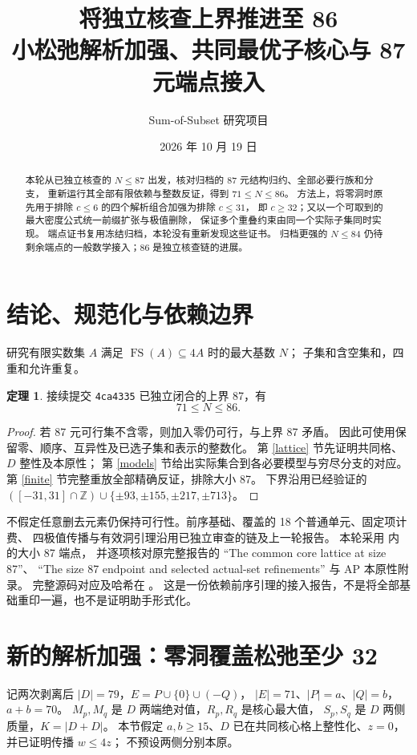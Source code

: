 \documentclass[11pt,a4paper]{article}
\title{将独立核查上界推进至 86\\\large 小松弛解析加强、共同最优子核心与 87 元端点接入}
\author{Sum-of-Subset 研究项目}
\date{2026 年 10 月 19 日}
\newcommand{\FS}{\operatorname{FS}}
\newcommand{\Z}{\mathbb Z}
\theoremstyle{definition}
\newtheorem{theorem}{定理}[section]
\begin{document}
\maketitle
\begin{abstract}
本轮从已独立核查的 $N\le87$ 出发，核对归档的 87 元结构归约、全部必要行族和分支，
重新运行其全部有限依赖与整数反证，得到 $71\le N\le86$。
方法上，将零洞时原先用于排除 $c\le6$ 的四个解析组合加强为排除 $c\le31$，
即 $c\ge32$；又以一个可取到的最大密度公式统一前缀扩张与极值删除，
保证多个重叠约束由同一个实际子集同时实现。
端点证书复用冻结归档，本轮没有重新发现这些证书。
归档更强的 $N\le84$ 仍待剩余端点的一般数学接入；86 是独立核查链的进展。
\end{abstract}

\section{结论、规范化与依赖边界}
研究有限实数集 $A$ 满足 $\FS(A)\subseteq4A$ 时的最大基数 $N$；
子集和含空集和，四重和允许重复。
\begin{theorem}
接续提交 \texttt{4ca4335} 已独立闭合的上界 87，有
\[\boxed{71\le N\le86.}\]
\end{theorem}
\begin{proof}
若 87 元可行集不含零，则加入零仍可行，与上界 87 矛盾。
因此可使用保留零、顺序、互异性及已选子集和表示的整数化。
第 \ref{lattice} 节先证明共同格、$D$ 整性及本原性；
第 \ref{models} 节给出实际集合到各必要模型与穷尽分支的对应。
第 \ref{finite} 节完整重放全部精确反证，排除大小 87。
下界沿用已经验证的
$([-31,31]\cap\Z)\cup\{\pm93,\pm155,\pm217,\pm713\}$。
\end{proof}
不假定任意删去元素仍保持可行性。前序基础、覆盖的 18 个普通单元、固定项计费、
四极值传播与有效洞引理沿用已独立审查的链及上一轮报告。
本轮采用  内  的大小 87 端点，
并逐项核对原完整报告的 ``The common core lattice at size 87''、
``The size 87 endpoint and selected actual-set refinements'' 与 AP 本原性附录。
完整源码对应及哈希在 。
这是一份依赖前序引理的接入报告，不是将全部基础重印一遍，也不是证明助手形式化。

\section{新的解析加强：零洞覆盖松弛至少 32}\label{slack}
记两次剥离后 $|D|=79$，$E=P\cup\{0\}\cup(-Q)$，
$|E|=71$、$|P|=a$、$|Q|=b$，$a+b=70$。
$M_p,M_q$ 是 $D$ 两端绝对值，$R_p,R_q$ 是核心最大值，
$S_p,S_q$ 是 $D$ 两侧质量，$K=|D+D|$。
本节假定 $a,b\ge15$、$D$ 已在共同核心格上整性化、$z=0$，并已证明传播 $w\le4z$；
不预设两侧分别本原。
\end{document}
